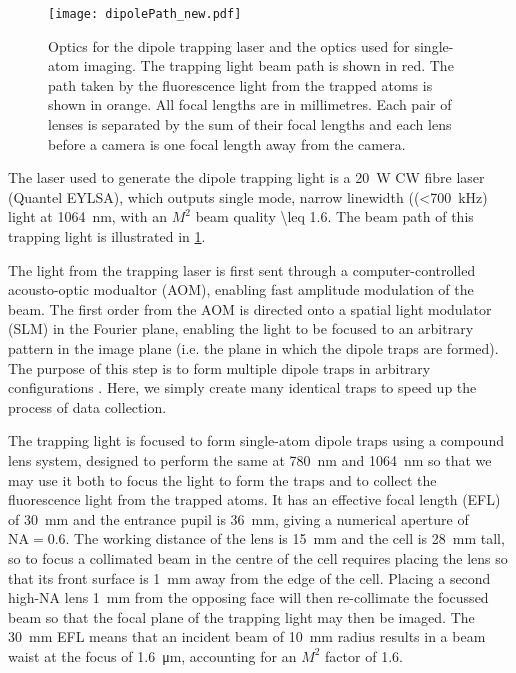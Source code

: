 \documentclass[../Thesis-IJspeert.tex]{subfiles}
\begin{document}
\begin{figure}
	\centering
	\texttt{[image: dipolePath\_new.pdf]}
	\caption{Optics for the dipole trapping laser and the optics used for single-atom imaging. The trapping light beam path is shown in red. The path taken by the fluorescence light from the trapped atoms is shown in orange. All focal lengths are in millimetres. Each pair of lenses is separated by the sum of their focal lengths and each lens before a camera is one focal length away from the camera.}
	\label{fig:exptSetup}
\end{figure}

The laser used to generate the dipole trapping light is a \SI{20}{\W} CW fibre laser (Quantel EYLSA), which outputs single mode, narrow linewidth ((\SI{<700}{\kHz}) light at \SI{1064}{\nm}, with an $M^2$ beam quality \num{\leq 1.6}. The beam path of this trapping light is illustrated in \cref{fig:exptSetup}.

The light from the trapping laser is first sent through a computer-controlled acousto-optic modualtor (AOM), enabling fast amplitude modulation of the beam. The first order from the AOM is directed onto a spatial light modulator (SLM) in the Fourier plane, enabling the light to be focused to an arbitrary pattern in the image plane (i.e. the plane in which the dipole traps are formed). The purpose of this step is to form multiple dipole traps in arbitrary configurations \cite{Holland2018}. Here, we simply create many identical traps to speed up the process of data collection.

The trapping light is focused to form single-atom dipole traps using a compound lens system, designed to perform the same at \SI{780}{\nm} and \SI{1064}{\nm} so that we may use it both to focus the light to form the traps and to collect the fluorescence light from the trapped atoms. It has an effective focal length (EFL) of \SI{30}{\mm} and the entrance pupil is \SI{36}{\mm}, giving a numerical aperture of $\mathrm{NA} = 0.6$. The working distance of the lens is \SI{15}{\mm} and the cell is \SI{28}{\mm} tall, so to focus a collimated beam in the centre of the cell requires placing the lens so that its front surface is \SI{1}{\mm} away from the edge of the cell. Placing a second high-NA lens \SI{1}{\mm} from the opposing face will then re-collimate the focussed beam so that the focal plane of the trapping light may then be imaged. The \SI{30}{\mm} EFL means that an incident beam of \SI{10}{\mm} radius results in a beam waist at the focus of \SI{1.6}{\um}, accounting for an $M^2$ factor of \num{1.6}. 
\end{document}
